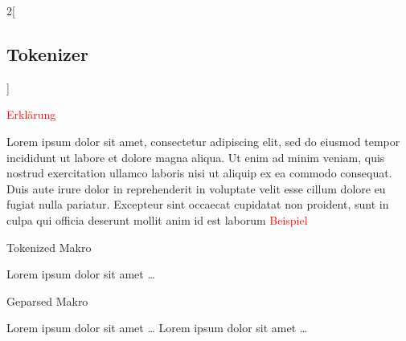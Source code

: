   \begin{paracol}{2}[\subsection{Tokenizer}]
    \label{ssec:Tokenizer}

      \textcolor{red}{Erklärung}

      Lorem ipsum dolor sit amet, consectetur adipiscing elit, sed do eiusmod tempor incididunt ut labore et dolore magna aliqua. Ut enim ad minim veniam, quis nostrud exercitation ullamco laboris nisi ut aliquip ex ea commodo consequat. Duis aute irure dolor in reprehenderit in voluptate velit esse cillum dolore eu fugiat nulla pariatur. Excepteur sint occaecat cupidatat non proident, sunt in culpa qui officia deserunt mollit anim id est laborum
    \switchcolumn
      \textcolor{red}{Beispiel}

      \begin{myCodeEnv}
        
        \caption{Tokenized Makro}
        \label{fig:ex_tok}
      \end{myCodeEnv}

    \label{ssec:Parser}
      Lorem ipsum dolor sit amet \ldots
    \switchcolumn
      \begin{myCodeEnv}
        
        \caption{Geparsed Makro}
        \label{fig:ex_ast}
      \end{myCodeEnv}

    \label{ssec:Interpreter}
      Lorem ipsum dolor sit amet \ldots
    \switchcolumn
      Lorem ipsum dolor sit amet \ldots
  \end{paracol}

